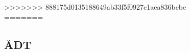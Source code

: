 \begin{figure}[htbp]

>>>>>>> 888175d0135188649ab33f5f0927c1aea836bebe
=======

\subsection{ÅDT}
\label{AEDT}

\end{figure}
